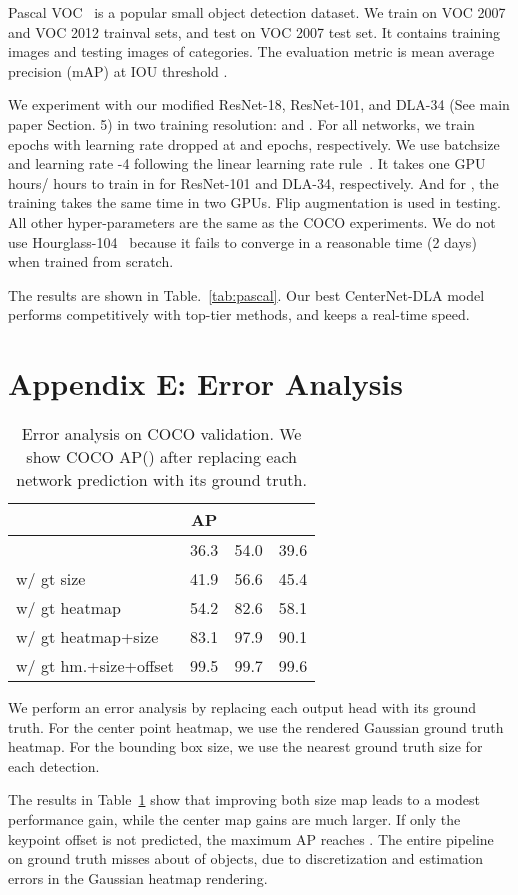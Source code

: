 \documentclass[10pt,twocolumn,letterpaper]{article}
\begin{document}
Pascal VOC~\cite{pascal-voc-2012} is a popular small object detection dataset. 
We train on VOC 2007 and VOC 2012 trainval sets, and test on VOC 2007 test set.
It contains  training images and  testing images of  categories. 
The evaluation metric is mean average precision (mAP) at IOU threshold .

We experiment with our modified ResNet-18, ResNet-101, and DLA-34 (See main paper Section. 5) in two training resolution:  and .
For all networks, we train  epochs with learning rate dropped  at  and  epochs, respectively.
We use batchsize  and learning rate -4 following the linear learning rate rule~\cite{goyal2017accurate}.
It takes one GPU  hours/  hours to train in  for ResNet-101 and DLA-34, respectively.
And for , the training takes the same time in two GPUs.
Flip augmentation is used in testing.
All other hyper-parameters are the same as the COCO experiments.
We do not use Hourglass-104~\cite{Law_2018_ECCV} because it fails to converge in a reasonable time (2 days) when trained from scratch.

The results are shown in Table.~\ref{tab:pascal}.
Our best CenterNet-DLA model performs competitively with top-tier methods, and keeps a real-time speed.


\section*{Appendix E: Error Analysis}

\begin{table}
\centering
\begin{tabular}{l c c c}
\hline
 & AP &  &  \\
\hline
          & 36.3 & 54.0 & 39.6 \\
w/ gt size & 41.9 & 56.6 & 45.4 \\
w/ gt heatmap & 54.2 & 82.6 & 58.1 \\
w/ gt heatmap+size & 83.1 & 97.9 & 90.1 \\
w/ gt hm.+size+offset & 99.5 & 99.7 & 99.6 \\
\hline
\end{tabular}
\caption{Error analysis on COCO validation. We show COCO AP() after replacing each network prediction with its ground truth.}
\label{tab:gt}
\end{table}

We perform an error analysis by replacing each output head with its ground truth.
For the center point heatmap, we use the rendered Gaussian ground truth heatmap.
For the bounding box size, we use the nearest ground truth size for each detection.

The results in Table~\ref{tab:gt} show that improving both size map leads to a modest performance gain, while the center map gains are much larger.
If only the keypoint offset is not predicted, the maximum AP reaches .
The entire pipeline on ground truth misses about  of objects, due to discretization and estimation errors in the Gaussian heatmap rendering.
\end{document}
